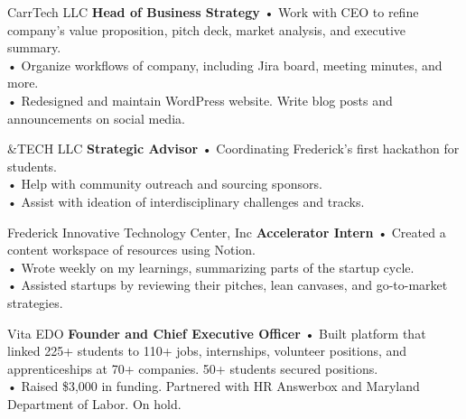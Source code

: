 {CarrTech LLC}
{\textbf{Head of Business Strategy}}
{• Work with CEO to refine company's value proposition, pitch deck, market analysis, and executive summary.\\
• Organize workflows of company, including Jira board, meeting minutes, and more.\\
• Redesigned and maintain WordPress website. Write blog posts and announcements on social media.
}

{\&TECH LLC}
{\textbf{Strategic Advisor}}
{• Coordinating Frederick's first hackathon for students. \\
• Help with community outreach and sourcing sponsors.\\
• Assist with ideation of interdisciplinary challenges and tracks.
}

{Frederick Innovative Technology Center, Inc}
{\textbf{Accelerator Intern}}
{• Created a content workspace of resources using Notion. \\ •  Wrote weekly on my learnings, summarizing parts of the startup cycle. \\ •  Assisted startups by reviewing their pitches, lean canvases, and go-to-market strategies.
}

{Vita EDO}
{\textbf{Founder and Chief Executive Officer}}
{• Built platform that linked 225+ students to 110+ jobs, internships, volunteer positions, and apprenticeships at 70+ companies. 50+ students secured positions.\\• Raised \$3,000 in funding. Partnered with HR Answerbox and Maryland Department of Labor. On hold.}